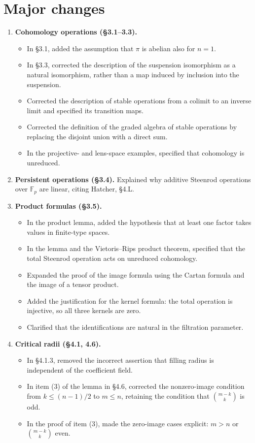\section*{Major changes}
\begin{enumerate}
\item \textbf{Cohomology operations (\S3.1--3.3).}
\begin{itemize}
\item In \S3.1, added the assumption that $\pi$ is abelian also for $n=1$.
\item In \S3.3, corrected the description of the suspension isomorphism as a natural isomorphism, rather than a map induced by inclusion into the suspension.
\item Corrected the description of stable operations from a colimit to an inverse limit and specified its transition maps.
\item Corrected the definition of the graded algebra of stable operations by replacing the disjoint union with a direct sum.
\item In the projective- and lens-space examples, specified that cohomology is unreduced.
\end{itemize}

\item \textbf{Persistent operations (\S3.4).}
Explained why additive Steenrod operations over $\mathbb F_p$ are linear, citing Hatcher, \S4.L.

\item \textbf{Product formulas (\S3.5).}
\begin{itemize}
\item In the product lemma, added the hypothesis that at least one factor takes values in finite-type spaces.
\item In the lemma and the Vietoris--Rips product theorem, specified that the total Steenrod operation acts on unreduced cohomology.
\item Expanded the proof of the image formula using the Cartan formula and the image of a tensor product.
\item Added the justification for the kernel formula: the total operation is injective, so all three kernels are zero.
\item Clarified that the identifications are natural in the filtration parameter.
\end{itemize}

\item \textbf{Critical radii (\S4.1, 4.6).}
\begin{itemize}
\item In \S4.1.3, removed the incorrect assertion that filling radius is independent of the coefficient field.
\item In item (3) of the lemma in \S4.6, corrected the nonzero-image condition from $k\leq(n-1)/2$ to $m\leq n$, retaining the condition that $\binom{m-k}{k}$ is odd.
\item In the proof of item (3), made the zero-image cases explicit: $m>n$ or $\binom{m-k}{k}$ even.
\end{itemize}


\end{enumerate}
